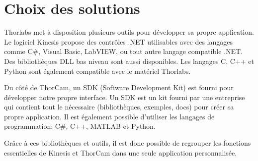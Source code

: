 \section{Choix des solutions}
Thorlabs met à disposition plusieurs outils pour développer sa propre application. Le logiciel Kinesis propose des contrôles .NET utilisables avec des langages comme C\#, Visual Basic, LabVIEW, ou tout autre langage compatible .NET. Des bibliothèques DLL bas niveau sont aussi disponibles. Les langages C, C++ et Python sont également compatible avec le matériel Thorlabs.

Du côté de ThorCam, un SDK (Software Development Kit) est fourni pour développer notre propre interface. Un SDK est un kit fourni par une entreprise qui contient tout le nécessaire (bibliothèques, exemples, docs) pour créer sa propre application. Il est également possible d'utiliser les langages de programmation: C\#, C++, MATLAB et Python.

Grâce à ces bibliothèques et outils, il est donc possible de regrouper les fonctions essentielles de Kinesis et ThorCam dans une seule application personnalisée.
